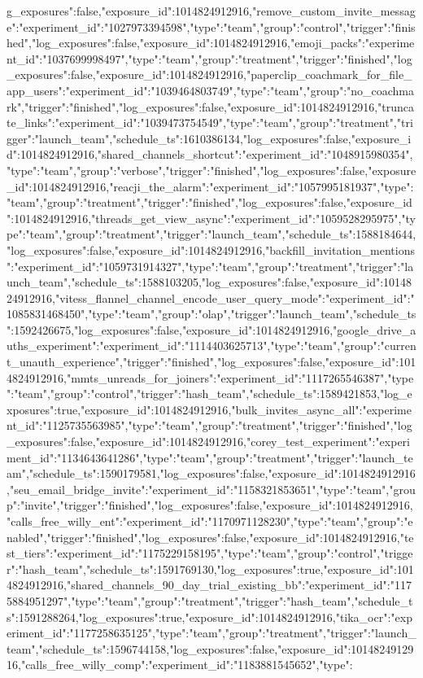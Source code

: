 {g_exposures":false,"exposure_id":1014824912916},"remove_custom_invite_message":{"experiment_id":"1027973394598","type":"team","group":"control","trigger":"finished","log_exposures":false,"exposure_id":1014824912916},"emoji_packs":{"experiment_id":"1037699998497","type":"team","group":"treatment","trigger":"finished","log_exposures":false,"exposure_id":1014824912916},"paperclip_coachmark_for_file_app_users":{"experiment_id":"1039464803749","type":"team","group":"no_coachmark","trigger":"finished","log_exposures":false,"exposure_id":1014824912916},"truncate_links":{"experiment_id":"1039473754549","type":"team","group":"treatment","trigger":"launch_team","schedule_ts":1610386134,"log_exposures":false,"exposure_id":1014824912916},"shared_channels_shortcut":{"experiment_id":"1048915980354","type":"team","group":"verbose","trigger":"finished","log_exposures":false,"exposure_id":1014824912916},"reacji_the_alarm":{"experiment_id":"1057995181937","type":"team","group":"treatment","trigger":"finished","log_exposures":false,"exposure_id":1014824912916},"threads_get_view_async":{"experiment_id":"1059528295975","type":"team","group":"treatment","trigger":"launch_team","schedule_ts":1588184644,"log_exposures":false,"exposure_id":1014824912916},"backfill_invitation_mentions":{"experiment_id":"1059731914327","type":"team","group":"treatment","trigger":"launch_team","schedule_ts":1588103205,"log_exposures":false,"exposure_id":1014824912916},"vitess_flannel_channel_encode_user_query_mode":{"experiment_id":"1085831468450","type":"team","group":"olap","trigger":"launch_team","schedule_ts":1592426675,"log_exposures":false,"exposure_id":1014824912916},"google_drive_auths_experiment":{"experiment_id":"1114403625713","type":"team","group":"current_unauth_experience","trigger":"finished","log_exposures":false,"exposure_id":1014824912916},"mmts_unreads_for_joiners":{"experiment_id":"1117265546387","type":"team","group":"control","trigger":"hash_team","schedule_ts":1589421853,"log_exposures":true,"exposure_id":1014824912916},"bulk_invites_async_all":{"experiment_id":"1125735563985","type":"team","group":"treatment","trigger":"finished","log_exposures":false,"exposure_id":1014824912916},"corey_test_experiment":{"experiment_id":"1134643641286","type":"team","group":"treatment","trigger":"launch_team","schedule_ts":1590179581,"log_exposures":false,"exposure_id":1014824912916},"seu_email_bridge_invite":{"experiment_id":"1158321853651","type":"team","group":"invite","trigger":"finished","log_exposures":false,"exposure_id":1014824912916},"calls_free_willy_ent":{"experiment_id":"1170971128230","type":"team","group":"enabled","trigger":"finished","log_exposures":false,"exposure_id":1014824912916},"test_tiers":{"experiment_id":"1175229158195","type":"team","group":"control","trigger":"hash_team","schedule_ts":1591769130,"log_exposures":true,"exposure_id":1014824912916},"shared_channels_90_day_trial_existing_bb":{"experiment_id":"1175884951297","type":"team","group":"treatment","trigger":"hash_team","schedule_ts":1591288264,"log_exposures":true,"exposure_id":1014824912916},"tika_ocr":{"experiment_id":"1177258635125","type":"team","group":"treatment","trigger":"launch_team","schedule_ts":1596744158,"log_exposures":false,"exposure_id":1014824912916},"calls_free_willy_comp":{"experiment_id":"1183881545652","type":}
